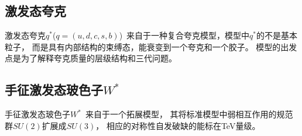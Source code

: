 \subsection{激发态夸克}
\label{sec:QStar}
激发态夸克$q^*$($q=(u,d,c,s,b)$)~\cite{qstar1,qstar2}来自于一种复合夸克模型，模型中$q^*$的不是基本粒子，
而是具有内部结构的束缚态，能衰变到一个夸克和一个胶子。
模型的出发点是为了解释夸克质量的层级结构和三代问题。

\subsection{手征激发态玻色子$W^*$}
\label{sec:WStar}

手征激发态玻色子$W^*$~\cite{Chizhov:2009fc,Chizhov:2010jg}来自于一个拓展模型，
其将标准模型中弱相互作用的规范群$SU(2)$扩展成$SU(3)$，
相应的对称性自发破缺的能标在TeV量级。





















